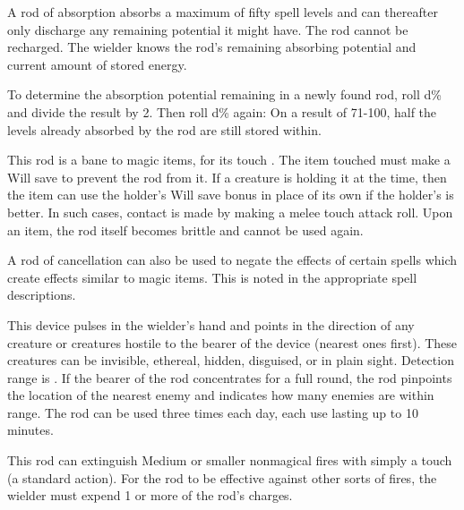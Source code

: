 A rod of absorption absorbs a maximum of fifty spell levels and can thereafter only discharge any remaining potential it might have. The rod cannot be recharged. The wielder knows the rod's remaining absorbing potential and current amount of stored energy.

To determine the absorption potential remaining in a newly found rod, roll d\% and divide the result by 2. Then roll d\% again: On a result of 71-100, half the levels already absorbed by the rod are still stored within.


 This rod is a bane to magic items, for its touch . The item touched must make a Will save to prevent the rod from  it. If a creature is holding it at the time, then the item can use the holder's Will save bonus in place of its own if the holder's is better. In such cases, contact is made by making a melee touch attack roll. Upon  an item, the rod itself becomes brittle and cannot be used again.

A rod of cancellation can also be used to negate the effects of certain spells which create effects similar to magic items. This is noted in the appropriate spell descriptions.


 This device pulses in the wielder's hand and points in the direction of any creature or creatures hostile to the bearer of the device (nearest ones first). These creatures can be invisible, ethereal, hidden, disguised, or in plain sight. Detection range is . If the bearer of the rod concentrates for a full round, the rod pinpoints the location of the nearest enemy and indicates how many enemies are within range. The rod can be used three times each day, each use lasting up to 10 minutes.


 This rod can extinguish Medium or smaller nonmagical fires with simply a touch (a standard action). For the rod to be effective against other sorts of fires, the wielder must expend 1 or more of the rod's charges.

